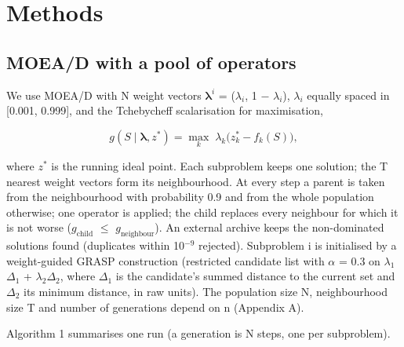 \section{Methods}\label{sec:methods}

\subsection{MOEA/D with a pool of operators}\label{sec:moea_d_with_a_pool_of_operat}

We use MOEA/D with N weight vectors $\boldsymbol{\lambda}^{i}$ = ($\lambda_{i}$, 1 $-$ $\lambda_{i}$), $\lambda_{i}$ equally spaced in [0.001, 0.999], and the Tchebycheff scalarisation for maximisation,

\begin{equation*}
g(S \mid \boldsymbol{\lambda}, z^{*}) = \max_{k}\; \lambda_k \bigl(z^{*}_k - f_k(S)\bigr),
\end{equation*}

\noindent where $z^{*}$ is the running ideal point. Each subproblem keeps one solution; the T nearest weight vectors form its neighbourhood. At every step a parent is taken from the neighbourhood with probability 0.9 and from the whole population otherwise; one operator is applied; the child replaces every neighbour for which it is not worse ($g_{\mathrm{child}}$ $\leq$ $g_{\mathrm{neighbour}}$). An external archive keeps the non-dominated solutions found (duplicates within 10$^{-9}$ rejected). Subproblem i is initialised by a weight-guided GRASP construction (restricted candidate list with $\alpha$ = 0.3 on $\lambda$$_{1}$$\Delta$$_{1}$ + $\lambda$$_{2}$$\Delta$$_{2}$, where $\Delta$$_{1}$ is the candidate's summed distance to the current set and $\Delta$$_{2}$ its minimum distance, in raw units). The population size N, neighbourhood size T and number of generations depend on n (Appendix A).

Algorithm 1 summarises one run (a generation is N steps, one per subproblem).

